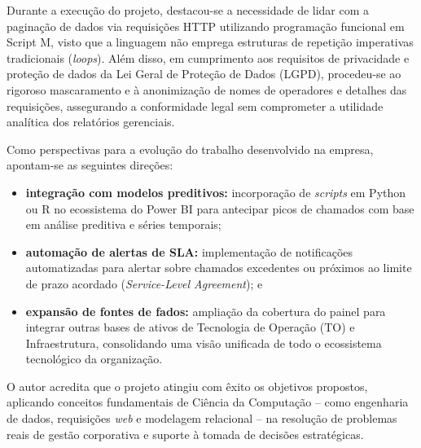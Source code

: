
Durante a execução do projeto, destacou-se a necessidade de lidar com a paginação de dados via requisições HTTP utilizando programação funcional em Script M, visto que a linguagem não emprega estruturas de repetição imperativas tradicionais (\textit{loops}). Além disso, em cumprimento aos requisitos de privacidade e proteção de dados da Lei Geral de Proteção de Dados (LGPD), procedeu-se ao rigoroso mascaramento e à anonimização de nomes de operadores e detalhes das requisições, assegurando a conformidade legal sem comprometer a utilidade analítica dos relatórios gerenciais.




Como perspectivas para a evolução do trabalho desenvolvido na empresa, apontam-se as seguintes direções:

\begin{itemize}
	\item \textbf{integração com modelos preditivos:} incorporação de \textit{scripts} em Python ou R no ecossistema do Power BI para antecipar picos de chamados com base em análise preditiva e séries temporais;
	
	\item \textbf{automação de alertas de SLA:} implementação de notificações automatizadas para alertar sobre chamados excedentes ou próximos ao limite de prazo acordado (\textit{Service-Level Agreement}); e
	
	\item \textbf{expansão de fontes de fados:} ampliação da cobertura do painel para integrar outras bases de ativos de Tecnologia de Operação (TO) e Infraestrutura, consolidando uma visão unificada de todo o ecossistema tecnológico da organização.
\end{itemize}



O autor acredita que o projeto atingiu com êxito os objetivos propostos, aplicando conceitos fundamentais de Ciência da Computação -- como engenharia de dados, requisições \textit{web} e modelagem relacional -- na resolução de problemas reais de gestão corporativa e suporte à tomada de decisões estratégicas.
